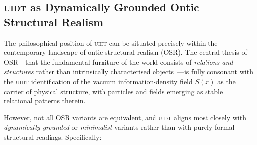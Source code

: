 %
\subsection{\textsc{uidt} as Dynamically Grounded Ontic Structural Realism}
\label{sec:osr_positioning}

The philosophical position of \textsc{uidt} can be situated precisely within
the contemporary landscape of ontic structural realism (OSR). The central
thesis of OSR---that the fundamental furniture of the world consists of
\emph{relations and structures} rather than intrinsically characterised
objects~\cite{Ladyman2007,French2014,McKenzie2017}---is fully consonant
with the \textsc{uidt} identification of the vacuum information-density
field $S(x)$ as the carrier of physical structure, with particles and
fields emerging as stable relational patterns therein.

However, not all OSR variants are equivalent, and \textsc{uidt} aligns
most closely with \emph{dynamically grounded} or \emph{minimalist} variants
rather than with purely formal-structural readings. Specifically:


